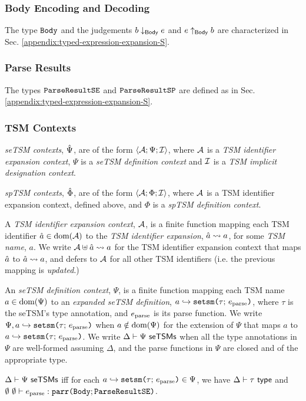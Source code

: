 \subsubsection{Body Encoding and Decoding}
The type $\mathtt{Body}$ and the judgements $b \downarrow_\mathsf{Body} e$ and $e \uparrow_\mathsf{Body} b$ are characterized in Sec. \ref{appendix:typed-expression-expansion-S}.

\subsubsection{Parse Results}
The types $\mathtt{ParseResultSE}$ and $\mathtt{ParseResultSP}$ are defined as in Sec. \ref{appendix:typed-expression-expansion-S}.

\subsubsection{TSM Contexts}

\emph{seTSM contexts}, $\hat{\Psi}$, are of the form $\langle \mathcal{A}; \Psi; \mathcal{I} \rangle$, where $\mathcal{A}$ is a \emph{TSM identifier expansion context}, $\Psi$ is a \emph{seTSM definition context} and $\mathcal{I}$ is a \emph{TSM implicit designation context}.

\emph{spTSM contexts}, $\hat\Phi$, are of the form $\langle \mathcal{A}; \Phi; \mathcal{I} \rangle$, where $\mathcal{A}$ is a {TSM identifier expansion context}, defined above, and $\Phi$ is a \emph{spTSM definition context}. 

A \emph{TSM identifier expansion context}, $\mathcal{A}$, is a finite function mapping each TSM identifier $\hat{a} \in \text{dom}(\mathcal{A})$ to the \emph{TSM identifier expansion}, $\hat{a} \leadsto a$, for some \emph{TSM name}, $a$. We write $\mathcal{A} \uplus \hat{a} \leadsto a$ for the TSM identifier expansion context that maps $\hat{a}$ to $\hat{a} \leadsto a$, and defers to $\mathcal{A}$ for all other TSM identifiers (i.e. the previous mapping is \emph{updated}.)

An \emph{seTSM definition context}, $\Psi$, is a finite function mapping each TSM name $a \in \text{dom}(\Psi)$ to an \emph{expanded seTSM definition}, $a \hookrightarrow \texttt{setsm}\texttt{(}\tau;\,e_\text{parse}\texttt{)}$, where $\tau$ is the seTSM's type annotation, and $e_\text{parse}$ is its parse function. We write $\Psi, a \hookrightarrow \texttt{setsm}\texttt{(}\tau;\,e_\text{parse}\texttt{)}$ when $a \notin \text{dom}(\Psi)$ for the extension of $\Psi$ that maps $a$ to $a \hookrightarrow \texttt{setsm}\texttt{(}\tau;\,e_\text{parse}\texttt{)}$. We write $\Delta \vdash \Psi~\mathsf{seTSMs}$  when all the type annotations in $\Psi$ are well-formed assuming $\Delta$, and the parse functions in $\Psi$ are closed and of the appropriate type.

\begin{definition}\label{def:seTSM-def-ctx-formation} $\Delta \vdash \Psi~\mathsf{seTSMs}$ iff for each $a \hookrightarrow \texttt{setsm}\texttt{(}\tau;\,e_\text{parse}\texttt{)} \in \Psi$, we have $\Delta \vdash \tau~\mathsf{type}$ and $\emptyset~\emptyset \vdash e_\text{parse} : \texttt{parr}\texttt{(}\mathtt{Body}; \mathtt{ParseResultSE}\texttt{)}$.\end{definition}

